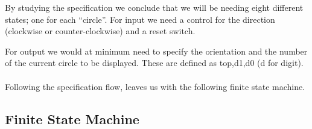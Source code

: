 By studying the specification we conclude that we will be needing
eight different states; one for each {}``circle''. For input we
need a control for the direction (clockwise or counter-clockwise)
and a reset switch.

For output we would at minimum need to specify the orientation and
the number of the current circle to be displayed. These are defined
as top,d1,d0 (d for digit).\\
\\
Following the specification flow, leaves us with the following
finite state machine.


\subsection{Finite State Machine}

